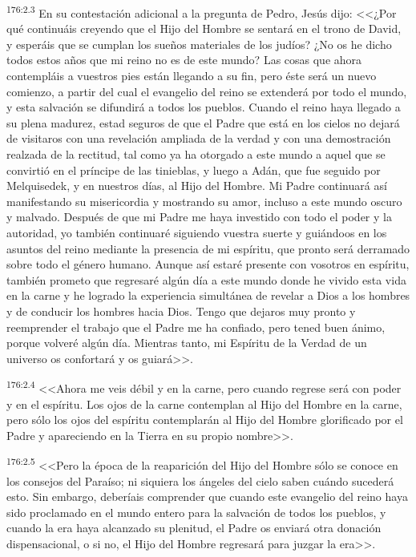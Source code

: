 \par 
\textsuperscript{176:2.3} En su contestación adicional a la pregunta de Pedro, Jesús dijo: <<¿Por qué continuáis creyendo que el Hijo del Hombre se sentará en el trono de David, y esperáis que se cumplan los sueños materiales de los judíos? ¿No os he dicho todos estos años que mi reino no es de este mundo? Las cosas que ahora contempláis a vuestros pies están llegando a su fin, pero éste será un nuevo comienzo, a partir del cual el evangelio del reino se extenderá por todo el mundo, y esta salvación se difundirá a todos los pueblos. Cuando el reino haya llegado a su plena madurez, estad seguros de que el Padre que está en los cielos no dejará de visitaros con una revelación ampliada de la verdad y con una demostración realzada de la rectitud, tal como ya ha otorgado a este mundo a aquel que se convirtió en el príncipe de las tinieblas, y luego a Adán, que fue seguido por Melquisedek, y en nuestros días, al Hijo del Hombre. Mi Padre continuará así manifestando su misericordia y mostrando su amor, incluso a este mundo oscuro y malvado. Después de que mi Padre me haya investido con todo el poder y la autoridad, yo también continuaré siguiendo vuestra suerte y guiándoos en los asuntos del reino mediante la presencia de mi espíritu, que pronto será derramado sobre todo el género humano. Aunque así estaré presente con vosotros en espíritu, también prometo que regresaré algún día a este mundo donde he vivido esta vida en la carne y he logrado la experiencia simultánea de revelar a Dios a los hombres y de conducir los hombres hacia Dios. Tengo que dejaros muy pronto y reemprender el trabajo que el Padre me ha confiado, pero tened buen ánimo, porque volveré algún día. Mientras tanto, mi Espíritu de la Verdad de un universo os confortará y os guiará>>.

\par 
\textsuperscript{176:2.4} <<Ahora me veis débil y en la carne, pero cuando regrese será con poder y en el espíritu. Los ojos de la carne contemplan al Hijo del Hombre en la carne, pero sólo los ojos del espíritu contemplarán al Hijo del Hombre glorificado por el Padre y apareciendo en la Tierra en su propio nombre>>.

\par 
\textsuperscript{176:2.5} <<Pero la época de la reaparición del Hijo del Hombre sólo se conoce en los consejos del Paraíso; ni siquiera los ángeles del cielo saben cuándo sucederá esto. Sin embargo, deberíais comprender que cuando este evangelio del reino haya sido proclamado en el mundo entero para la salvación de todos los pueblos, y cuando la era haya alcanzado su plenitud, el Padre os enviará otra donación dispensacional, o si no, el Hijo del Hombre regresará para juzgar la era>>.

